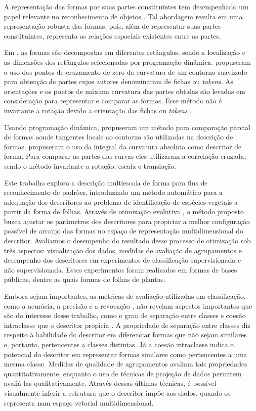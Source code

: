 A representação das formas por suas partes constituintes tem desempenhado um papel relevante no reconhecimento de objetos \cite{Ullman:1996}. Tal abordagem resulta em uma representação robusta das formas, pois, além de representar suas partes constituintes, representa as relações espaciais existentes entre as partes.  

Em , as formas são decompostas em diferentes retângulos, sendo a localização e as dimensões dos retângulos selecionadas por programação dinâmica.  propuseram o uso dos pontos de cruzamento de zero da curvatura de um contorno suavizado para obtenção de partes cujos autores denominaram de fichas ou \textit{tokens}. As orientações e os pontos de máxima curvatura das partes obtidas são levadas em consideração para representar e comparar as formas. Esse método não é invariante a rotação devido a orientação das fichas ou \textit{tokens} \cite{DiRuberto:2009}. 

Usando programação dinâmica,  propuseram um método para comparação parcial de formas aonde tangentes locais ao contorno são utilizadas na descrição de formas.  propuseram o uso da integral da curvatura absoluta como descritor de forma. Para comparar as partes das curvas eles utilizaram a correlação cruzada, sendo o método invariante a rotação, escala e translação.  

Este trabalho explora a descrição multiescala de forma \cite{Costa:2009}  para fins de reconhecimento de padrões, introduzindo um método automático para a adequação dos descritores ao problema de identificação de espécies vegetais a partir da forma de folhas. Através de otimização evolutiva \cite{Andries:2007}, o método proposto busca ajustar os parâmetros dos descritores para propiciar a melhor configuração possível de arranjo das formas no espaço de representação multidimensional do descritor. Avaliamos o desempenho do resultado desse processo de otimização sob três aspectos: visualização dos dados, medidas de avaliação de agrupamentos e desempenho dos descritores em experimentos de classificação supervisionada e não supervisionada. Esses experimentos foram realizados em formas de bases públicas, dentre as quais formas de folhas de plantas. 

Embora sejam importantes, as métricas de avaliação utilizadas em classificação, como a acurácia, a precisão e a revocação  \cite{Ting2010}, não revelam aspectos importantes que são do interesse desse trabalho, como o grau de separação entre classes e coesão intraclasse que o descritor propicia \cite{Meta:2009}. A propriedade de separação entre classes diz respeito à habilidade do descritor em diferenciar formas que não sejam similares e, portanto, pertencentes a classes distintas. Já a coesão intraclasse indica o potencial do descritor em representar formas similares como pertencentes a uma mesma classe.  Medidas de qualidade de agrupamentos \cite{Meta:2009} avaliam tais propriedades quantitativamente, enquanto o uso de técnicas de projeção de dados \cite{Amorim201535} permitem avaliá-las qualitativamente. Através dessas últimas técnicas, é possível visualmente inferir a estrutura que o descritor impõe aos dados, quando os representa num espaço vetorial multidimensional. 

